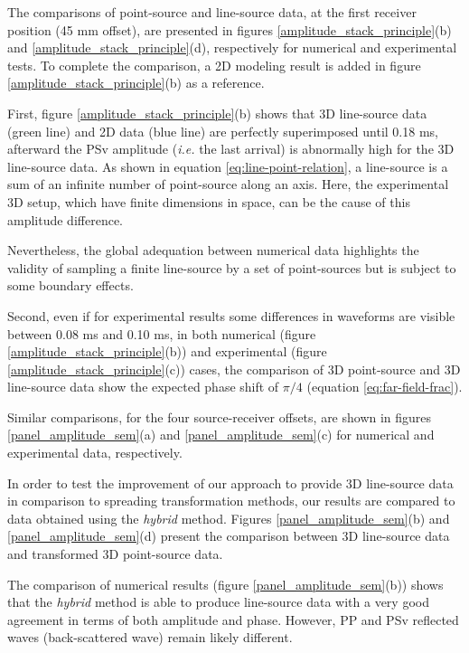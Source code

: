 \documentclass[manuscript,revised]{geophysics}
\begin{document}
\noindent The comparisons of point-source and line-source data, at the first receiver position (45 mm offset), are presented in figures \ref{amplitude_stack_principle}(b) and \ref{amplitude_stack_principle}(d), respectively for numerical and experimental tests. To complete the comparison, a 2D modeling result is added in figure \ref{amplitude_stack_principle}(b) as a reference.

\noindent First, figure \ref{amplitude_stack_principle}(b) shows that 3D line-source data (green line) and 2D data (blue line) are perfectly superimposed until 0.18 ms, afterward the PSv amplitude (\textit{i.e.} the last arrival) is abnormally high for the 3D line-source data. As shown in equation \ref{eq:line-point-relation}, a line-source is a sum of an infinite number of point-source along an axis. Here, the experimental 3D setup, which have finite dimensions in space, can be the cause of this amplitude difference.

\noindent Nevertheless, the global adequation between numerical data highlights the validity of sampling a finite line-source by a set of point-sources but is subject to some boundary effects.

\noindent Second, even if for experimental results some differences in waveforms are visible between 0.08 ms and 0.10 ms, in both numerical (figure \ref{amplitude_stack_principle}(b)) and experimental (figure \ref{amplitude_stack_principle}(c)) cases, the comparison of 3D point-source and 3D line-source data show the expected phase shift of $\pi/4$ (equation \ref{eq:far-field-frac}).

\noindent Similar comparisons, for the four source-receiver offsets, are shown in figures \ref{panel_amplitude_sem}(a) and  \ref{panel_amplitude_sem}(c) for numerical and experimental data, respectively.

\noindent In order to test the improvement of our approach to provide 3D line-source data in comparison to spreading transformation methods, our results are compared to data obtained using the \textit{hybrid} method. Figures \ref{panel_amplitude_sem}(b) and  \ref{panel_amplitude_sem}(d) present the comparison between 3D line-source data and transformed 3D point-source data.

\noindent The comparison of numerical results (figure \ref{panel_amplitude_sem}(b)) shows that the \textit{hybrid} method is able to produce line-source data with a very good agreement  in terms of both amplitude and phase. However, PP and PSv reflected waves (back-scattered wave) remain likely different.
\end{document}
